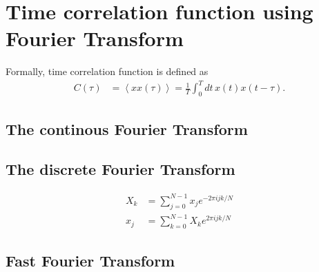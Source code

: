 \documentclass{article}
\begin{document}
\section{Time correlation function using Fourier Transform}
Formally, time correlation function is defined as
\begin{align}
  C(\tau) &= \left< x x(\tau)\right> = \frac{1}{T}\int_0^{T} dt\, x(t) x(t-\tau).
\end{align}

\subsection{The continous Fourier Transform}
\subsection{The discrete Fourier Transform}
\begin{align}
  X_k &= \sum_{j=0}^{N-1} x_j e^{-2 \pi i j k / N} \\
  x_j &= \sum_{k=0}^{N-1} X_k e^{ 2 \pi i j k / N}
\end{align}
\subsection{Fast Fourier Transform}
\end{document}
